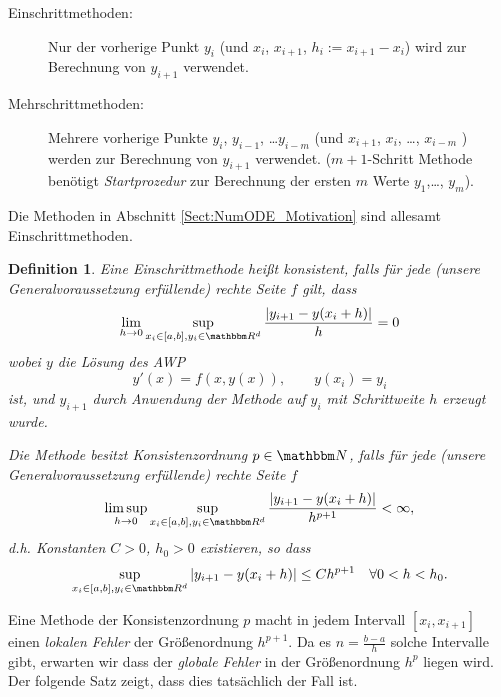 \documentclass[12pt,a4paper]{book}
\theoremstyle{break}
\newtheorem{definition}[theorem]{Definition}
\theoremstyle{nonumberplain}
\newcommand{\N}{\mathbbm N}
\newcommand{\R}{\mathbbm R}
\newcommand{\1}{\mathbbm{1}} 			      	%
\begin{document}
\begin{description}
\item[Einschrittmethoden:] Nur der vorherige Punkt $y_i$ (und $x_i$, $x_{i+1}$, $h_i:=x_{i+1}-x_i$) wird zur Berechnung von $y_{i+1}$ verwendet.
\item[Mehrschrittmethoden:] Mehrere vorherige Punkte $y_i$, $y_{i-1}$, \ldots $y_{i-m}$ (und $x_{i+1}$, $x_{i}$, \ldots, $x_{i-m}$ ) 
werden zur Berechnung von $y_{i+1}$ verwendet.
($m+1$-Schritt Methode benötigt \emph{Startprozedur} zur Berechnung der ersten $m$ Werte $y_1$,\ldots, $y_m$).
\end{description}

Die Methoden in Abschnitt \ref{Sect:NumODE_Motivation} sind allesamt Einschrittmethoden. 

\begin{definition}\label{def:Konsistenz}
Eine Einschrittmethode heißt \emph{konsistent}, falls für jede (unsere Generalvoraussetzung erfüllende) rechte Seite
$f$ gilt, dass
\[
\lim_{h\to 0} \sup_{x_i\in [a,b], y_i\in \R^d} \frac{\left| y_{i+1}- y(x_i+h) \right|}{h}= 0
\]
wobei $y$ die Lösung des AWP
\[
y'(x)=f(x,y(x)), \qquad y(x_i)=y_i
\]
ist, und $y_{i+1}$ durch Anwendung der Methode auf $y_i$ mit Schrittweite $h$ erzeugt wurde.

Die Methode besitzt \emph{Konsistenzordnung} $p\in \N$, falls 
für jede (unsere Generalvoraussetzung erfüllende) rechte Seite
$f$ 
\[
\limsup_{h\to 0} \sup_{x_i\in [a,b], y_i\in \R^d} \frac{\left| y_{i+1}- y(x_i+h) \right|}{h^{p+1}}<\infty,
\]
d.h. Konstanten $C>0$, $h_0>0$ existieren, so dass
\[
\sup_{x_i\in [a,b], y_i\in \R^d} \left| y_{i+1}- y(x_i+h) \right| \leq C h^{p+1} \quad \forall 0<h<h_0.
\]
\end{definition}


Eine Methode der Konsistenzordnung $p$ macht in jedem Intervall $[x_i,x_{i+1}]$ einen \emph{lokalen Fehler} 
der Größenordnung $h^{p+1}$. Da es $n=\frac{b-a}{h}$ solche Intervalle gibt, erwarten wir dass der \emph{globale Fehler}
in der Größenordnung $h^p$ liegen wird. Der folgende Satz zeigt, dass dies tatsächlich der Fall ist.
\end{document}
